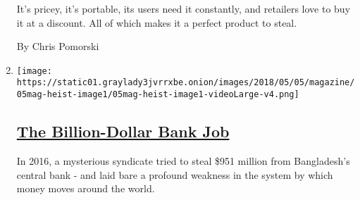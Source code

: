 \begin{enumerate}
  It's pricey, it's portable, its users need it constantly, and
  retailers love to buy it at a discount. All of which makes it a
  perfect product to steal.

  By Chris Pomorski
\item
  \texttt{[image: https://static01.graylady3jvrrxbe.onion/images/2018/05/05/magazine/05mag-heist-image1/05mag-heist-image1-videoLarge-v4.png]}

  \hypertarget{the-billion-dollar-bank-job}{%
  \subsection{\texorpdfstring{\href{/interactive/2018/05/03/magazine/money-issue-bangladesh-billion-dollar-bank-heist.html}{The
  Billion-Dollar Bank
  Job}}{The Billion-Dollar Bank Job}}\label{the-billion-dollar-bank-job}}

  In 2016, a mysterious syndicate tried to steal \$951 million from
  Bangladesh's central bank - and laid bare a profound weakness in the
  system by which money moves around the world.
\end{enumerate}

